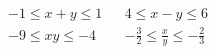 \begin{align*}
  -1 \leq x+y \leq 1 & & 4 \leq x-y \leq 6 \\
  -9 \leq xy \leq -4 & & -\frac{3}{2} \leq \frac{x}{y} \leq -\frac{2}{3} 
\end{align*}
